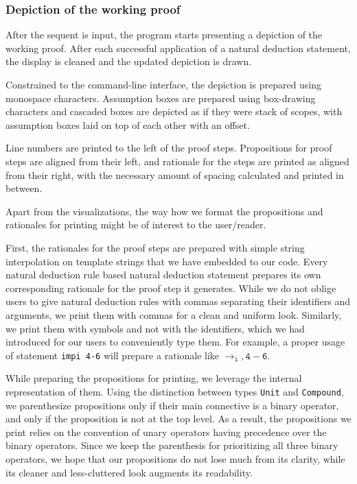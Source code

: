 \documentclass{article}
\begin{document}
\subsubsection{Depiction of the working proof}

After the sequent is input, the program starts presenting a depiction
of the working proof. After each successful application of a natural
deduction statement, the display is cleaned and the updated depiction
is drawn.

Constrained to the command-line interface, the depiction is prepared
using monospace characters. Assumption boxes are prepared using
box-drawing characters and cascaded boxes are depicted as if they
were stack of scopes, with assumption boxes laid on top of each other
with an offset.

Line numbers are printed to the left of the proof steps.
Propositions for proof steps are aligned from their left,
and rationale for the steps are printed as aligned from their
right, with the necessary amount of spacing calculated and
printed in between.

Apart from the visualizations, the way how we format the propositions
and rationales for printing might be of interest to the user/reader.

First, the rationales for the proof steps are prepared with simple
string interpolation on template strings that we have embedded
to our code. Every natural deduction rule based natural deduction
statement prepares its own corresponding rationale for the proof
step it generates. While we do not oblige users to give natural
deduction rules with commas separating their identifiers and
arguments, we print them with commas for a clean and uniform look.
Similarly, we print them with symbols and not with the identifiers,
which we had introduced for our users to conveniently type them.
For example, a proper usage of statement \texttt{impi 4-6} will
prepare a rationale like $\mathtt{\rightarrow_i, 4-6}$.

While preparing the propositions for printing, we leverage the
internal representation of them. Using the distinction between
types \verb|Unit| and \verb|Compound|, we parenthesize propositions
only if their main connective is a binary operator, and only if the
proposition is not at the top level. As a result, the propositions
we print relies on the convention of unary operators having precedence
over the binary operators. Since we keep the parenthesis for prioritizing
all three binary operators, we hope that our propositions do not lose
much from its clarity, while its cleaner and less-cluttered look
augments its readability.
\end{document}
